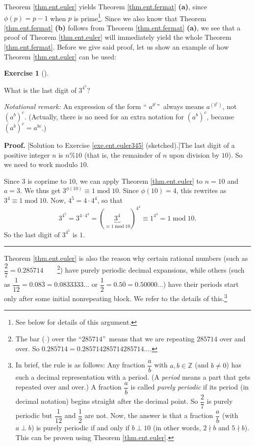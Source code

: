 \documentclass[numbers=enddot,12pt,final,onecolumn,notitlepage]{scrartcl}%
\newcounter{exer}
\numberwithin{exer}{subsection}
\theoremstyle{definition}
\newtheorem{exmp}[exer]{Exercise}
\newenvironment{exercise}[1][]
{\begin{exmp}[#1]\begin{leftbar}}
{\end{leftbar}\end{exmp}}
\newenvironment{proof}[1][Proof]{\noindent\textbf{#1.} }{\ \rule{0.5em}{0.5em}}
\begin{document}
Theorem \ref{thm.ent.euler} yields Theorem \ref{thm.ent.fermat} \textbf{(a)},
since $\phi\left(  p\right)  =p-1$ when $p$ is prime\footnote{See below for
details of this argument.}. Since we also know that Theorem
\ref{thm.ent.fermat} \textbf{(b)} follows from Theorem \ref{thm.ent.fermat}
\textbf{(a)}, we see that a proof of Theorem \ref{thm.ent.euler} will
immediately yield the whole Theorem \ref{thm.ent.fermat}. Before we give said
proof, let us show an example of how Theorem \ref{thm.ent.euler} can be used:

\begin{exercise}
\label{exe.ent.euler345}What is the last digit of $3^{4^{5}}$?

\textit{Notational remark:} An expression of the form \textquotedblleft%
$a^{b^{c}}$\textquotedblright\ always means $a^{\left(  b^{c}\right)  }$, not
$\left(  a^{b}\right)  ^{c}$. (Actually, there is no need for an extra
notation for $\left(  a^{b}\right)  ^{c}$, because $\left(  a^{b}\right)
^{c}=a^{bc}$.)
\end{exercise}

\begin{proof}
[Solution to Exercise \ref{exe.ent.euler345} (sketched).]The last digit of a
positive integer $n$ is $n\%10$ (that is, the remainder of $n$ upon division
by $10$). So we need to work modulo $10$.

Since $3$ is coprime to $10$, we can apply Theorem \ref{thm.ent.euler} to
$n=10$ and $a=3$. We thus get $3^{\phi\left(  10\right)  }\equiv
1\operatorname{mod}10$. Since $\phi\left(  10\right)  =4$, this rewrites as
$3^{4}\equiv1\operatorname{mod}10$. Now, $4^{5}=4\cdot4^{4}$, so that%
\[
3^{4^{5}}=3^{4\cdot4^{4}}=\left(  \underbrace{3^{4}}_{\equiv
1\operatorname{mod}10}\right)  ^{4^{4}}\equiv1^{4^{4}}=1\operatorname{mod}10.
\]
So the last digit of $3^{4^{5}}$ is $1$.
\end{proof}

Theorem \ref{thm.ent.euler} is also the reason why certain rational numbers
(such as $\dfrac{2}{7}=0.\overline{285714}$\ \ \ \ \footnote{The bar
($\overline{}$) over the \textquotedblleft$285714$\textquotedblright\ means
that we are repeating $285714$ over and over. So $0.\overline{285714}%
=0.285714285714285714\ldots$.}) have purely periodic decimal expansions, while
others (such as $\dfrac{1}{12}=0.08\overline{3}=0.0833333\ldots$ or $\dfrac
{1}{2}=0.5\overline{0}=0.50000\ldots$) have their periods start only after
some initial nonrepeating block. We refer \cite[\S 4]{Conrad-Euler} to the
details of this.\footnote{In brief, the rule is as follows: Any fraction
$\dfrac{a}{b}$ with $a,b\in\mathbb{Z}$ (and $b\neq0$) has such a decimal
representation with a period. (A \textit{period} means a part that gets
repeated over and over.) A fraction $\dfrac{a}{b}$ is called \textit{purely
periodic} if its period (in decimal notation) begins straight after the
decimal point. So $\dfrac{2}{7}$ is purely periodic but $\dfrac{1}{12}$ and
$\dfrac{1}{2}$ are not. Now, the answer is that a fraction $\dfrac{a}{b}$
(with $a\perp b$) is purely periodic if and only if $b\perp10$ (in other
words, $2\nmid b$ and $5\nmid b$). This can be proven using Theorem
\ref{thm.ent.euler}.}
\end{document}
